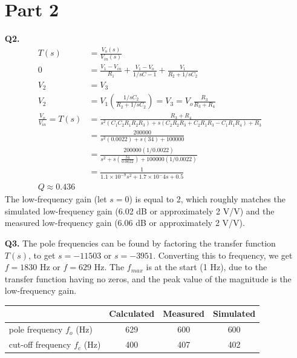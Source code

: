 \documentclass[12pt]{article}
\begin{document}
\begin{itemize}
    \section*{Part 2}
    \item [\textbf{Q2.}]
    \begin{equation*}
    \begin{aligned}
        T(s) &= \frac{V_o(s)}{V_{in}(s)} \\
        0 &= \frac{V_1-V_{in}}{R_1}+\frac{V_1-V_o}{1/sC-1}+\frac{V_1}{R_2+1/sC_2} \\
        V_2 &= V_3 \\
        V_2 &= V_1 (\frac{1/sC_2}{R_2+1/sC_2}) = V_3 = V_o \frac{R_3}{R_3+R_4} \\
        \frac{V_o}{V_{in}} = T(s) &= \frac{R_3+R_4}{s^2(C_1C_2R_1R_2R_3) + s(C_2R_2R_3 + C_2R_1R_3 - C_1R_1R_4) + R_3} \\
        &= \frac{200 000}{s^2(0.0022) + s(34) + 100 000} \\
        &= \frac{200 000(1/0.0022)}{s^2 + s(\frac{34}{0.0022}) + 100 000(1/0.0022)} \\
        &= \frac{1}{1.1 \times 10^{-8} s^2 + 1.7 \times 10^-4 s + 0.5} \\
        Q \approx 0.436 
    \end{aligned}
    \end{equation*}
    The low-frequency gain (let $s = 0$) is equal to 2, which roughly matches the simulated low-frequency gain (6.02 dB or approximately 2 V/V) and the measured low-frequency gain (6.06 dB or approximately 2 V/V).
    \item [\textbf{Q3.}]
    The pole frequencies can be found by factoring the transfer function $T(s)$, to get $s = -11503$ or $s = -3951$. Converting this to frequency, we get $f = 1830$ Hz or $f = 629$ Hz. The $f_{max}$ is at the start (1 Hz), due to the transfer function having no zeros, and the peak value of the magnitude is the low-frequency gain.
    \begin{table}[ht]
        \centering
        \begin{tabular}{l|c|c|c|}
        \cline{2-4}
         &
          \multicolumn{1}{c|}{Calculated} &
          \multicolumn{1}{c|}{Measured} &
          Simulated \\ \hline
        \multicolumn{1}{|l|}{pole frequency $f_o$ (Hz)}      & 629 & 600 & 600  \\ \hline
        \multicolumn{1}{|l|}{cut-off frequency $f_c$ (Hz)}   & 400 & 407 & 402 \\ \hline

\end{tabular}
\end{table}
\end{itemize}
\end{document}
